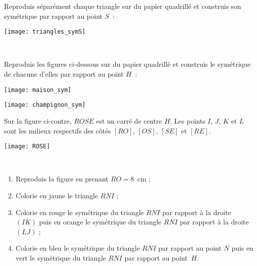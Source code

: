 \begin{exercice}

\begin{minipage}[c]{0.48\linewidth}
Reproduis séparément chaque triangle sur du papier quadrillé et construis son symétrique par rapport au point $S$ :
 \end{minipage} \hfill%
 \begin{minipage}[c]{0.48\linewidth}
 \texttt{[image: triangles\_symS]}
 \end{minipage} \\
\end{exercice}


\begin{exercice}
Reproduis les figures ci-dessous sur du papier quadrillé et construis le symétrique de chacune d'elles par rapport au point $H$ :
\begin{colenumerate}{2}
 \item 

 \texttt{[image: maison\_sym]}

 \item
 
 \texttt{[image: champignon\_sym]}
 \end{colenumerate}
\end{exercice}


\begin{exercice}

\begin{minipage}[c]{0.48\linewidth}
Sur la figure ci-contre, $ROSE$ est un carré de centre $H$. Les points $I$, $J$, $K$ et $L$ sont les milieux respectifs des côtés $[RO]$, $[OS]$, $[SE]$ et $[RE]$.
 \end{minipage} \hfill%
\begin{minipage}[c]{0.48\linewidth}
 \texttt{[image: ROSE]}
 \end{minipage} \\
 \begin{enumerate}
  \item Reproduis la figure en prenant $RO = 8$ cm ;
  \item Colorie en jaune le triangle $RNI$ ;
  \item Colorie en rouge le symétrique du triangle $RNI$ par rapport à la droite $(IK)$ puis en orange le symétrique du triangle $RNI$ par rapport à la droite $(LJ)$ ;
  \item Colorie en bleu le symétrique du triangle $RNI$ par rapport au point $N$ puis en vert le symétrique du triangle $RNI$ par rapport au point $H$.
 \end{enumerate}
\end{exercice}


